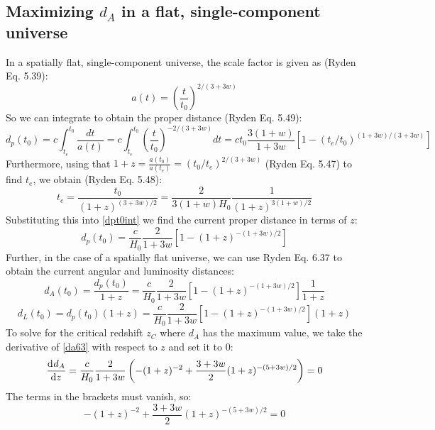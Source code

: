 \subsection{Maximizing $d_A$ in a flat, single-component universe}
In a spatially flat, single-component universe, the scale factor is given as (Ryden Eq. 5.39):
\begin{equation}
    a(t) = \left(\frac{t}{t_0}\right)^{2/(3 + 3w)}
\end{equation}
So we can integrate to obtain the proper distance (Ryden Eq. 5.49):
\begin{equation}\label{dpt063int}
    d_p(t_0) = c\int_{t_e}^{t_0}\frac{dt}{a(t)} = c\int_{t_e}^{t_0}\left(\frac{t}{t_0}\right)^{-2/(3 + 3w)}dt = ct_0\frac{3(1 + w)}{1 + 3w}\left[1 - (t_e/t_0)^{(1+3w)/(3+3w)}\right]
\end{equation}
Furthermore, using that $1 + z = \frac{a(t_0)}{a(t_e)} = (t_0/t_e)^{2/(3+3w)}$ (Ryden Eq. 5.47) to find $t_e$, we obtain (Ryden Eq. 5.48):
\begin{equation}
    t_e = \frac{t_0}{(1+z)^{(3+3w)/2}} = \frac{2}{3(1+w)H_0}\frac{1}{(1+z)^{3(1+w)/2}}
\end{equation}
Substituting this into \eqref{dpt0int} we find the current proper distance in terms of $z$:
\begin{equation}
    \boxed{d_p(t_0) = \frac{c}{H_0}\frac{2}{1+3w}\left[1 - (1+z)^{-(1+3w)/2}\right]}
\end{equation}
Further, in the case of a spatially flat universe, we can use Ryden Eq. 6.37 to obtain the current angular and luminosity distances:
\begin{equation}\label{da63}
    \boxed{d_A(t_0) = \frac{d_p(t_0)}{1+z} =  \frac{c}{H_0}\frac{2}{1+3w}\left[1 - (1+z)^{-(1+3w)/2}\right]\frac{1}{1+z}}
\end{equation}
\begin{equation}
    \boxed{d_L(t_0) = d_p(t_0)(1+z) = \frac{c}{H_0}\frac{2}{1+3w}\left[1 - (1+z)^{-(1+3w)/2}\right](1+z)}
\end{equation}
To solve for the critical redshift $z_C$ where $d_A$ has the maximum value, we take the derivative of \eqref{da63} with respect to $z$ and set it to 0:
\begin{equation}
    \dod{d_A}{z} =  \frac{c}{H_0}\frac{2}{1+3w}\left(-(1+z)^{-2} + \frac{3+3w}{2}(1+z)^{-(5+3w)/2}\right) = 0
\end{equation}
The terms in the brackets must vanish, so:
\begin{equation}
    -(1+z)^{-2} + \frac{3+3w}{2}(1+z)^{-(5+3w)/2} = 0
\end{equation}
